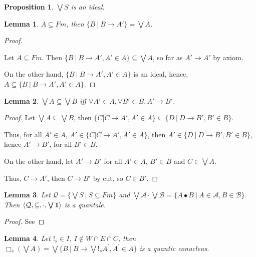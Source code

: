 \documentclass[a4paper]{article}
\newtheorem{prop}{Proposition}
\newtheorem{lemma}{Lemma}
\begin{document}
\begin{prop}
  $\bigvee S$ is an ideal.
\end{prop}

\begin{lemma}
  $A \subseteq Fm$, then $\{ B \: | \: B \rightarrow A' \} = \bigvee A$.
\end{lemma}

\begin{proof}
$ $

Let $A \subseteq Fm$. Then $\{ B \: | \: B \rightarrow A', A' \in A \} \subseteq \bigvee A$, so far as $A' \rightarrow A'$ by axiom.

On the other hand, $\{ B \: | \: B \rightarrow A', A' \in A \}$ is an ideal, hence, $A \subseteq \{ B \: | \: B \rightarrow A', A' \in A \}$.
\end{proof}

\begin{lemma}
  $\bigvee A \subseteq \bigvee B$ iff $\forall A' \in A, \forall B' \in B, A' \rightarrow B'$.
\end{lemma}

\begin{proof}
  Let $\bigvee A \subseteq \bigvee B$,
  then $\{ C | C \rightarrow A', A' \in A \} \subseteq \{ D \: | \: D \rightarrow B', B' \in B \}$.

Thus, for all $A' \in A$, $A' \in \{ C | C \rightarrow A', A' \in A \}$,
then $A' \in \{ D \: | \: D \rightarrow B', B' \in B \}$, hence $A' \rightarrow B'$, for all $B' \in B$.

On the other hand, let $A' \rightarrow B'$ for all $A' \in A$, $B' \in B$ and $C \in \bigvee A$.

Thus, $C \rightarrow A'$, then $C \rightarrow B'$ by cut, so $C \in B'$.

\end{proof}

\begin{lemma}
  Let $\mathcal{Q} = \{ \bigvee S \: | \: S \subseteq Fm \}$ and $\bigvee \mathcal{A} \cdot \bigvee \mathcal{B} =
  \{ A \bullet B \: | \: A \in \mathcal{A}, B \in \mathcal{B} \}$.
  Then $\langle \mathcal{Q}, \subseteq, \cdot, \bigvee{{\bf 1}}\rangle$ is a quantale.
\end{lemma}

\begin{proof}
  See
\end{proof}

\begin{lemma}
  Let $!_s \in I$, $I \notin W \cap E \cap C$,
  then $\Box_s (\bigvee A) = \bigvee \{ B \: | \: B \rightarrow \bigvee !_s A^{'}, A^{'} \in A \}$
  is a quantic conucleus.
\end{lemma}
\end{document}
